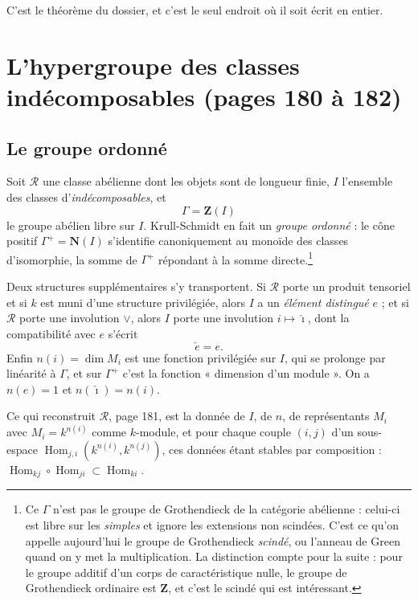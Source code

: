 \documentclass[11pt,a4paper]{article}
\begin{document}
C'est le théorème du dossier, et c'est le seul endroit où il soit écrit en
entier.

\section*{L'hypergroupe des classes indécomposables (pages 180 à 182)}

\subsection*{Le groupe ordonné}

Soit $\mathcal{R}$ une classe abélienne dont les objets sont de longueur finie,
$I$ l'ensemble des classes d'\emph{indécomposables}, et
\[
\Gamma = \mathbf{Z}(I)
\]
le groupe abélien libre sur $I$. Krull-Schmidt en fait un \emph{groupe
ordonné} : le cône positif $\Gamma^{+} = \mathbf{N}(I)$ s'identifie
canoniquement au monoïde des classes d'isomorphie, la somme de $\Gamma^{+}$
répondant à la somme directe.\footnote{Ce $\Gamma$ n'est pas le groupe de
Grothendieck de la catégorie abélienne : celui-ci est libre sur les
\emph{simples} et ignore les extensions non scindées. C'est ce qu'on appelle
aujourd'hui le groupe de Grothendieck \emph{scindé}, ou l'anneau de Green quand
on y met la multiplication. La distinction compte pour la suite : pour
le groupe additif d'un corps de caractéristique nulle, le groupe de Grothendieck
ordinaire est $\mathbf{Z}$, et c'est le scindé qui est intéressant.}

Deux structures supplémentaires s'y transportent. Si $\mathcal{R}$ porte un
produit tensoriel et si $k$ est muni d'une structure privilégiée, alors $I$ a
un \emph{élément distingué} $e$ ; et si $\mathcal{R}$ porte une involution
$\vee$, alors $I$ porte une involution $i \mapsto \check{\imath}$, dont la
compatibilité avec $e$ s'écrit
\[
\check{e} = e .
\]
Enfin $n(i) = \dim M_{i}$ est une fonction privilégiée sur $I$, qui se prolonge
par linéarité à $\Gamma$, et sur $\Gamma^{+}$ c'est la fonction « dimension
d'un module ». On a $n(e) = 1$ et $n(\check{\imath}) = n(i)$.

Ce qui reconstruit $\mathcal{R}$, page 181, est la donnée de $I$, de $n$, de
représentants $M_{i}$ avec $M_{i} = k^{n(i)}$ comme $k$-module, et pour chaque
couple $(i,j)$ d'un sous-espace $\operatorname{Hom}_{j,i}(k^{n(i)},
k^{n(j)})$, ces données étant stables par composition : $\operatorname{Hom}_{kj}
\circ \operatorname{Hom}_{ji} \subset \operatorname{Hom}_{ki}$.
\end{document}
